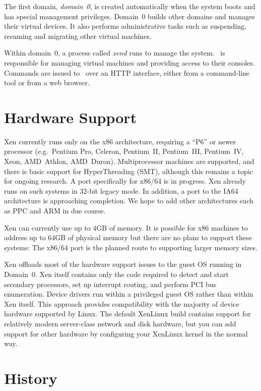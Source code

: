 The first domain, \emph{domain~0}, is created automatically when the
system boots and has special management privileges. Domain~0 builds
other domains and manages their virtual devices. It also performs
administrative tasks such as suspending, resuming and migrating other
virtual machines.

Within domain~0, a process called \emph{xend} runs to manage the system.
\Xend\ is responsible for managing virtual machines and providing access
to their consoles. Commands are issued to \xend\ over an HTTP interface,
either from a command-line tool or from a web browser.


\section{Hardware Support}

Xen currently runs only on the x86 architecture, requiring a ``P6'' or
newer processor (e.g.\ Pentium Pro, Celeron, Pentium~II, Pentium~III,
Pentium~IV, Xeon, AMD~Athlon, AMD~Duron). Multiprocessor machines are
supported, and there is basic support for HyperThreading (SMT), although
this remains a topic for ongoing research. A port specifically for
x86/64 is in progress. Xen already runs on such systems in 32-bit legacy
mode. In addition, a port to the IA64 architecture is approaching
completion. We hope to add other architectures such as PPC and ARM in
due course.

Xen can currently use up to 4GB of memory. It is possible for x86
machines to address up to 64GB of physical memory but there are no plans
to support these systems: The x86/64 port is the planned route to
supporting larger memory sizes.

Xen offloads most of the hardware support issues to the guest OS running
in Domain~0. Xen itself contains only the code required to detect and
start secondary processors, set up interrupt routing, and perform PCI
bus enumeration. Device drivers run within a privileged guest OS rather
than within Xen itself. This approach provides compatibility with the
majority of device hardware supported by Linux. The default XenLinux
build contains support for relatively modern server-class network and
disk hardware, but you can add support for other hardware by configuring
your XenLinux kernel in the normal way.


\section{History}

